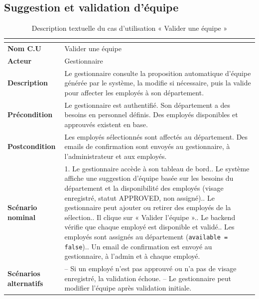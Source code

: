 \documentclass[12pt,a4paper]{report}
\numberwithin{figure}{chapter}
\numberwithin{table}{chapter}
\begin{document}
\subsection{Suggestion et validation d'équipe}

\begin{table}[H]
  \centering
  \caption{Description textuelle du cas d'utilisation « Valider une équipe »}
  \label{tab:cu_team}
  \renewcommand{\arraystretch}{1.4}
  \begin{tabularx}{\textwidth}{|>{\bfseries}l|L|}
    \hline
     \\
    \hline
    Nom C.U & Valider une équipe \\
    \hline
    Acteur & Gestionnaire \\
    \hline
    Description & Le gestionnaire consulte la proposition automatique d'équipe générée
      par le système, la modifie si nécessaire, puis la valide pour affecter les employés
      à son département. \\
    \hline
    Précondition & Le gestionnaire est authentifié. Son département a des besoins en
      personnel définis. Des employés disponibles et approuvés existent en base. \\
    \hline
    Postcondition & Les employés sélectionnés sont affectés au département. Des emails
      de confirmation sont envoyés au gestionnaire, à l'administrateur et aux employés. \\
    \hline
    Scénario nominal &
      1. Le gestionnaire accède à son tableau de bord.. Le système affiche une suggestion d'équipe basée sur les besoins du département
         et la disponibilité des employés (visage enregistré, statut APPROVED, non assigné).. Le gestionnaire peut ajouter ou retirer des employés de la sélection.. Il clique sur « Valider l'équipe ».. Le backend vérifie que chaque employé est disponible et validé.. Les employés sont assignés au département (\texttt{available = false}).. Un email de confirmation est envoyé au gestionnaire, à l'admin et à chaque employé. \\
    \hline
    Scénarios alternatifs &
      -- Si un employé n'est pas approuvé ou n'a pas de visage enregistré, la validation échoue.\newline
      -- Le gestionnaire peut modifier l'équipe après validation initiale. \\
    \hline
  \end{tabularx}
\end{table}
\end{document}
